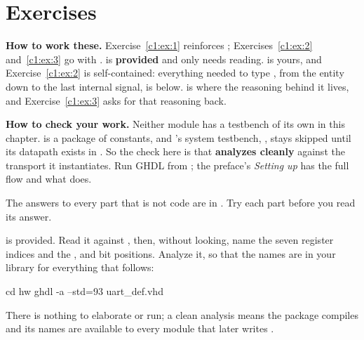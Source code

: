
\section{Exercises}
\label{c1:sec:exercises}\label{c1:app:c}

\begin{aside}
\textbf{How to work these.} Exercise~\ref{c1:ex:1} reinforces ;
Exercises~\ref{c1:ex:2} and~\ref{c1:ex:3} go with .  is
\textbf{provided} and only needs reading.  is yours, and Exercise~\ref{c1:ex:2} is
self-contained: everything needed to type , from the entity down to the last
internal signal, is below.  is where the reasoning behind it lives, and
Exercise~\ref{c1:ex:3} asks for that reasoning back.

\textbf{How to check your work.} Neither module has a testbench of its own in this chapter.
 is a package of constants, and 's system testbench,
, stays skipped until its datapath exists in . So the check here is
that  \textbf{analyzes cleanly} against the transport it instantiates. Run GHDL from
; the preface's \emph{Setting up} has the full flow and what 
does.

The answers to every part that is not code are in . Try each part before you read its
answer.
\end{aside}

\label{c1:ex:1}

  is provided. Read it against , then, without
looking, name the seven register indices and the ,  and 
bit positions. Analyze it, so that the names are in your  library for everything that
follows:

\begin{shell}
cd hw
ghdl -a --std=93 uart_def.vhd
\end{shell}

\noindent There is nothing to elaborate or run; a clean analysis means the package compiles and its
names are available to every module that later writes .

